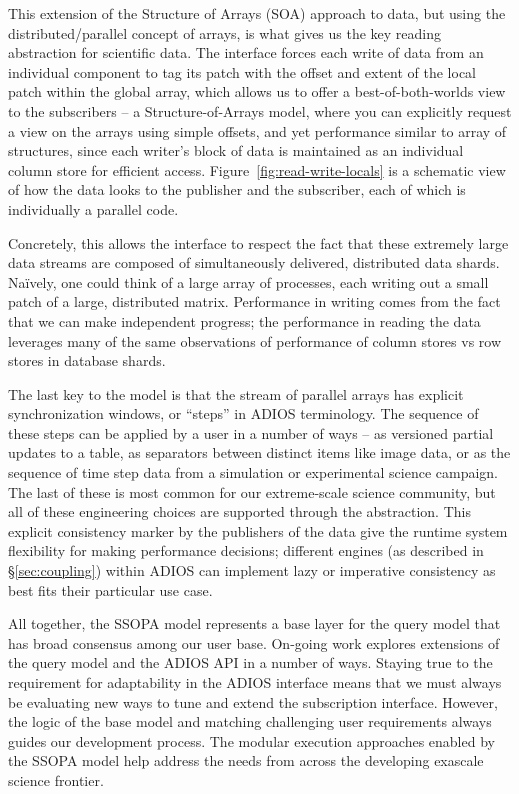 This extension of the Structure of Arrays (SOA) approach to data, but using the distributed/parallel concept of arrays, is what gives us the key reading abstraction for scientific data.  The interface forces each write of data from an individual component to tag its patch with the offset and extent of the local patch within the global array, which allows us to offer a best-of-both-worlds view to the subscribers -- a Structure-of-Arrays model, where you can explicitly request a view on the arrays using simple offsets, and yet performance similar to array of structures, since each writer's block of data is maintained as an individual column store for efficient access.  Figure~\ref{fig:read-write-locals} is a schematic view of how the data looks to the publisher and the subscriber, each of which is individually a parallel code.



Concretely, this allows the interface to respect the fact that these extremely large data streams are composed of simultaneously delivered, distributed data shards. Naïvely, one could think of a large array of processes, each writing out a small patch of a large, distributed matrix. Performance in writing comes from the fact that we can make independent progress; the performance in reading the data leverages many of the same observations of performance of column stores vs row stores in database shards.  

The last key to the model is that the stream of parallel arrays has explicit synchronization windows, or ``steps'' in  ADIOS terminology. The sequence of these steps can be applied by a user in a number of ways -- as versioned partial updates to a table, as separators between distinct items like image data, or as the sequence of time step data from a simulation or experimental science campaign. The last of these is most common for our extreme-scale science community, but all of these engineering choices are supported through the abstraction. This explicit consistency marker by the publishers of the data give the runtime system flexibility for making performance decisions; different engines (as described in \S\ref{sec:coupling}) within ADIOS can implement lazy or imperative consistency as best fits their particular use case.

All together, the SSOPA model represents a base layer for the query model that has broad consensus among our user base.  On-going work explores extensions of the query model and the ADIOS API in a number of ways. Staying true to the requirement for adaptability in the ADIOS interface means that we must always be evaluating new ways to tune and extend the subscription interface. However, the logic of the base model and matching challenging user requirements always guides our development process. 
The modular execution approaches enabled by the SSOPA model help address the needs from across the developing exascale science frontier. 

